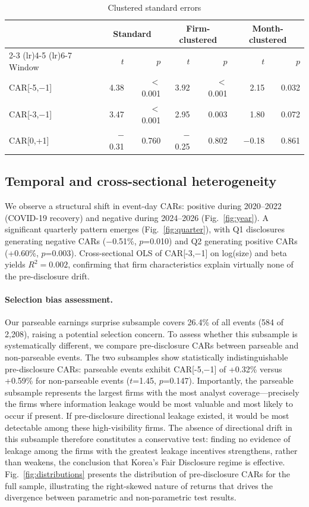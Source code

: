 \documentclass[review,authoryear]{elsarticle}
\begin{document}
\begin{table}[ht]
\caption{Clustered standard errors}
\label{tab:cluster}
\begin{tabular}{lrrrrrr}
\toprule
& \multicolumn{2}{c}{Standard} & \multicolumn{2}{c}{Firm-clustered} & \multicolumn{2}{c}{Month-clustered} \\
\cmidrule(lr){2-3} \cmidrule(lr){4-5} \cmidrule(lr){6-7}
Window & $t$ & $p$ & $t$ & $p$ & $t$ & $p$ \\
\midrule
CAR[-5,$-$1] & 4.38 & $<$0.001 & 3.92 & $<$0.001 & 2.15 & 0.032 \\
CAR[-3,$-$1] & 3.47 & $<$0.001 & 2.95 & 0.003 & 1.80 & 0.072 \\
CAR[0,+1] & $-$0.31 & 0.760 & $-$0.25 & 0.802 & $-$0.18 & 0.861 \\
\bottomrule
\end{tabular}
\end{table}

\subsection{Temporal and cross-sectional heterogeneity}

We observe a structural shift in event-day CARs: positive during 2020--2022 (COVID-19 recovery) and negative during 2024--2026 (Fig.~\ref{fig:year}). A significant quarterly pattern emerges (Fig.~\ref{fig:quarter}), with Q1 disclosures generating negative CARs ($-$0.51\%, $p$=0.010) and Q2 generating positive CARs (+0.60\%, $p$=0.003). Cross-sectional OLS of CAR[-3,$-$1] on log(size) and beta yields $R^2=0.002$, confirming that firm characteristics explain virtually none of the pre-disclosure drift.

\paragraph{Selection bias assessment.}

Our parseable earnings surprise subsample covers 26.4\% of all events (584 of 2,208), raising a potential selection concern. To assess whether this subsample is systematically different, we compare pre-disclosure CARs between parseable and non-parseable events. The two subsamples show statistically indistinguishable pre-disclosure CARs: parseable events exhibit CAR[-5,$-$1] of +0.32\% versus +0.59\% for non-parseable events ($t$=1.45, $p$=0.147). Importantly, the parseable subsample represents the largest firms with the most analyst coverage---precisely the firms where information leakage would be most valuable and most likely to occur if present. If pre-disclosure directional leakage existed, it would be most detectable among these high-visibility firms. The absence of directional drift in this subsample therefore constitutes a conservative test: finding no evidence of leakage among the firms with the greatest leakage incentives strengthens, rather than weakens, the conclusion that Korea's Fair Disclosure regime is effective. Fig.~\ref{fig:distributions} presents the distribution of pre-disclosure CARs for the full sample, illustrating the right-skewed nature of returns that drives the divergence between parametric and non-parametric test results.
\end{document}
